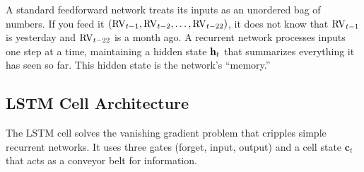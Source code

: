 \begin{intuition}
A standard feedforward network treats its inputs as an unordered bag of numbers.
If you feed it $(\operatorname{RV}_{t-1}, \operatorname{RV}_{t-2}, \ldots, \operatorname{RV}_{t-22})$, it does not know that $\operatorname{RV}_{t-1}$ is yesterday and $\operatorname{RV}_{t-22}$ is a month ago.
A recurrent network processes inputs one step at a time, maintaining a hidden state $\mathbf{h}_t$ that summarizes everything it has seen so far.
This hidden state is the network's ``memory.''
\end{intuition}

\subsection{LSTM Cell Architecture}

The LSTM cell solves the vanishing gradient problem that cripples simple recurrent networks.
It uses three gates (forget, input, output) and a cell state $\mathbf{c}_t$ that acts as a conveyor belt for information.

